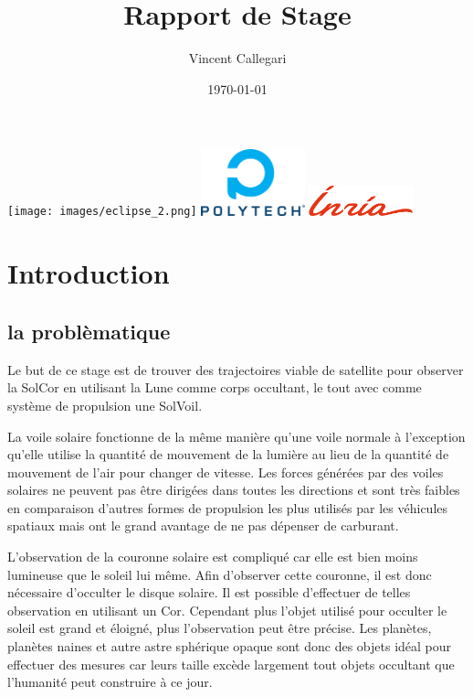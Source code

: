 \documentclass[12pt]{article} %
\title{Rapport de Stage} %
\author{Vincent Callegari} %
\date{\today} %
\begin{document}
		\maketitle
		\texttt{[image: images/eclipse\_2.png]}
		\vfill
		\includegraphics[width=3cm]{images/Logo_Reseau_Polytech.png} \hfill \includegraphics[width=3cm]{images/inria.png}
		\newpage
		\tableofcontents
		\newpage
		\section{Introduction}
		
		\subsection{la problèmatique}
		Le but de ce stage est de trouver des trajectoires viable de satellite pour observer la \gls{SolCor} en utilisant la Lune comme corps occultant, le tout avec comme système de propulsion une \gls{SolVoil}.
		
		La voile solaire fonctionne de la même manière qu'une voile normale à l'exception qu'elle utilise la quantité de mouvement de la lumière au lieu de la quantité de mouvement de l'air pour changer de vitesse. Les forces générées par des voiles solaires ne peuvent pas être dirigées dans toutes les directions et sont très faibles en comparaison d'autres formes de propulsion les plus utilisés par les véhicules spatiaux mais ont le grand avantage de ne pas dépenser de carburant.
		
		L'observation de la couronne solaire est compliqué car elle est bien moins lumineuse que le soleil lui même. Afin d'observer cette couronne, il est donc nécessaire d'occulter le disque solaire. Il est possible d'effectuer de telles observation en utilisant un \gls{Cor}. Cependant plus l'objet utilisé pour occulter le soleil est grand et éloigné, plus l'observation peut être précise. Les planètes, planètes naines et autre astre sphérique opaque sont donc des objets idéal pour effectuer des mesures car leurs taille excède largement tout objets occultant que l'humanité peut construire à ce jour.
		
\end{document}

